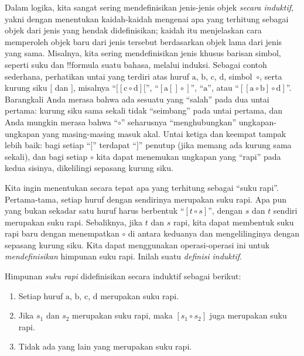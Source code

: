 \documentclass[../../../include/open-logic-section]{subfiles}
\begin{document}


Dalam logika, kita sangat sering mendefinisikan jenis-jenis objek
\emph{secara induktif}, yakni dengan menentukan kaidah-kaidah mengenai apa
yang terhitung sebagai objek dari jenis yang hendak didefinisikan; kaidah
itu menjelaskan cara memperoleh objek baru dari jenis tersebut berdasarkan
objek lama dari jenis yang sama. Misalnya, kita sering mendefinisikan jenis
khusus barisan simbol, seperti suku dan !!{formula} suatu bahasa, melalui
induksi. Sebagai contoh sederhana, perhatikan untai yang terdiri atas huruf
$\mathrm{a}$, $\mathrm{b}$, $\mathrm{c}$, $\mathrm{d}$, simbol~$\circ$,
serta kurung siku $[$ dan $]$, misalnya
``$[[\mathrm{c} \circ \mathrm{d}][$'', ``$[\mathrm{a}[]\circ]$'',
``$\mathrm{a}$'', atau ``$[[\mathrm{a} \circ \mathrm{b}]\circ
\mathrm{d}]$''. Barangkali Anda merasa bahwa ada sesuatu yang ``salah''
pada dua untai pertama: kurung siku sama sekali tidak ``seimbang'' pada
untai pertama, dan Anda mungkin merasa bahwa ``$\circ$'' seharusnya
``menghubungkan'' ungkapan-ungkapan yang masing-masing masuk akal. Untai
ketiga dan keempat tampak lebih baik: bagi setiap ``$[$'' terdapat
``$]$'' penutup (jika memang ada kurung sama sekali), dan bagi setiap
$\circ$ kita dapat menemukan ungkapan yang ``rapi'' pada kedua sisinya,
dikelilingi sepasang kurung siku.

Kita ingin menentukan secara tepat apa yang terhitung sebagai ``suku
rapi''. Pertama-tama, setiap huruf dengan sendirinya merupakan suku rapi.
Apa pun yang bukan sekadar satu huruf harus berbentuk ``$[t \circ s]$'',
dengan $s$ dan $t$ sendiri merupakan suku rapi. Sebaliknya, jika $t$ dan
$s$ rapi, kita dapat membentuk suku rapi baru dengan menempatkan $\circ$ di
antara keduanya dan mengelilinginya dengan sepasang kurung siku. Kita dapat
menggunakan operasi-operasi ini untuk \emph{mendefinisikan} himpunan suku
rapi. Inilah suatu \emph{definisi induktif}.

\begin{defn}
  Himpunan \emph{suku rapi} didefinisikan secara induktif sebagai berikut:
  \begin{enumerate}
  \item Setiap huruf $\mathrm{a}$, $\mathrm{b}$, $\mathrm{c}$,
    $\mathrm{d}$ merupakan suku rapi.
  \item Jika $s_1$ dan $s_2$ merupakan suku rapi, maka
    $[s_1 \circ s_2]$ juga merupakan suku rapi.
  \item Tidak ada yang lain yang merupakan suku rapi.
  \end{enumerate}
\end{defn}
\end{document}
